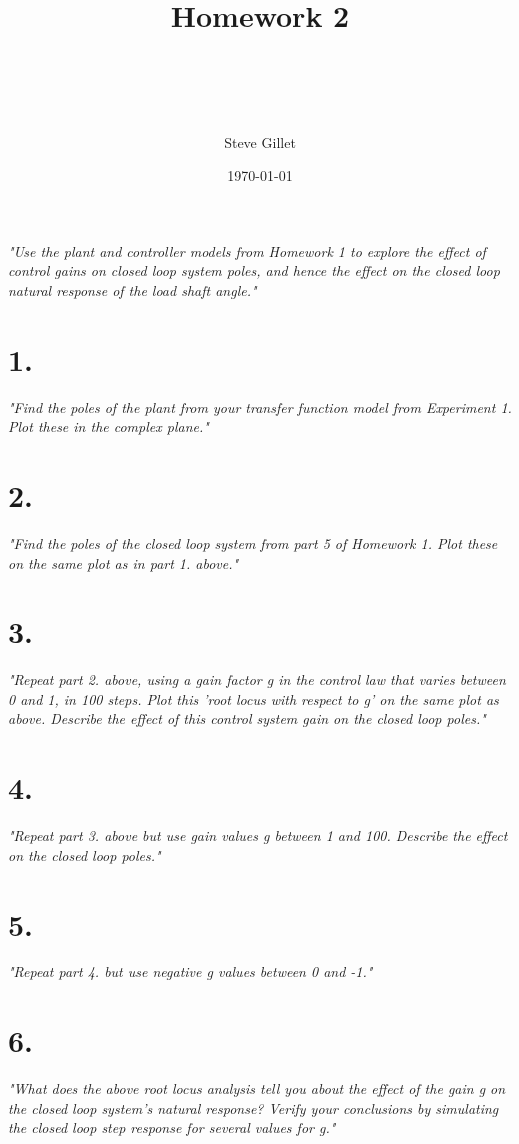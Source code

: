 \documentclass{article}
\title{Homework 2 \\ \className \\ \professorName \\ \taName}
\author{Steve Gillet}
\date{\today}
\begin{document}
\maketitle
\textit{
    "Use the plant and controller models from Homework 1 to explore the effect of control gains on
    closed loop system poles, and hence the effect on the closed loop natural response of the load
    shaft angle."
}

\section*{1.}

\textit{
    "Find the poles of the plant from your transfer function model from Experiment 1. Plot these
    in the complex plane."
}

\section*{2.}

\textit{
    "Find the poles of the closed loop system from part 5 of Homework 1. Plot these on the same
    plot as in part 1. above."
}

\section*{3.}

\textit{
    "Repeat part 2. above, using a gain factor g in the control law that varies between 0 and 1, in
    100 steps. Plot this 'root locus with respect to g' on the same plot as above. Describe the
    effect of this control system gain on the closed loop poles."
}

\section*{4.}

\textit{
    "Repeat part 3. above but use gain values g between 1 and 100. Describe the effect on the
    closed loop poles."
}

\section*{5.}

\textit{
    "Repeat part 4. but use negative g values between 0 and -1."
}

\section*{6.}

\textit{
    "What does the above root locus analysis tell you about the effect of the gain g on the closed
    loop system’s natural response? Verify your conclusions by simulating the closed loop step
    response for several values for g."
}
\end{document}
